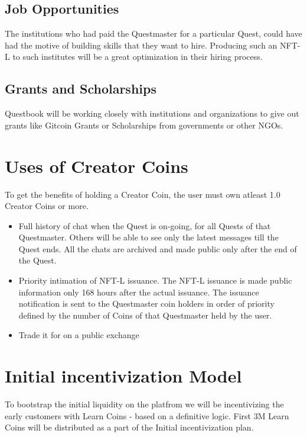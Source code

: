 \documentclass{article}
\begin{document}
    \subsection{Job Opportunities}
      The institutions who had paid the Questmaster for a particular Quest, could have had the motive of building skills that they want to hire. Producing such an NFT-L to such institutes will be a great optimization in their hiring process.
    \subsection{Grants and Scholarships}
      Questbook will be working closely with institutions and organizations to give out grants like Gitcoin Grants or Scholarships from governments or other NGOs.
  \section{Uses of Creator Coins}
    To get the benefits of holding a Creator Coin, the user must own atleast 1.0 Creator Coins or more. 
    \begin{itemize}
      \item Full history of chat when the Quest is on-going, for all Quests of that Questmaster. Others will be able to see only the latest messages till the Quest ends. All the chats are archived and made public only after the end of the Quest.
      \item Priority intimation of NFT-L issuance. The NFT-L issuance is made public information only 168 hours after the actual issuance. The issuance notification is sent to the Questmaster coin holders in order of priority defined by the number of Coins of that Questmaster held by the user.
      \item Trade it for on a public exchange
    \end{itemize}

  \section{Initial incentivization Model}
    To bootstrap the initial liquidity on the platfrom we will be incentivizing the early customers with Learn Coins - based on a definitive logic.
    First 3M Learn Coins will be distributed as a part of the Initial incentivization plan.
\end{document}
